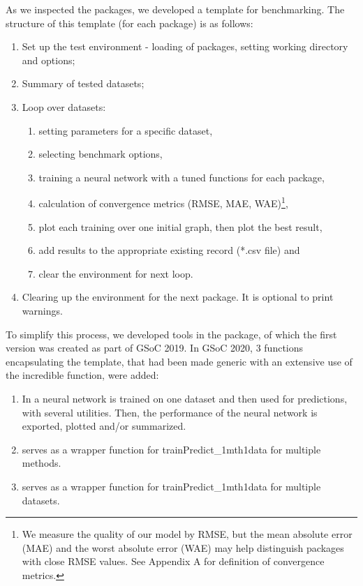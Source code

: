 As we inspected the packages, we developed a template for benchmarking.
The structure of this template (for each package) is as follows:

\begin{enumerate}
\def\labelenumi{\arabic{enumi}.}
\tightlist
\item
  Set up the test environment - loading of packages, setting working
  directory and options;
\item
  Summary of tested datasets;
\item
  Loop over datasets:

  \begin{enumerate}
  \def\labelenumii{\alph{enumii}.}
  \tightlist
  \item
    setting parameters for a specific dataset,
  \item
    selecting benchmark options,
  \item
    training a neural network with a tuned functions for each package,
  \item
    calculation of convergence metrics (RMSE, MAE, WAE)\footnote{We
      measure the quality of our model by RMSE, but the mean absolute
      error (MAE) and the worst absolute error (WAE) may help
      distinguish packages with close RMSE values. See Appendix A for
      definition of convergence metrics.},
  \item
    plot each training over one initial graph, then plot the best
    result,
  \item
    add results to the appropriate existing record (*.csv file) and
  \item
    clear the environment for next loop.
  \end{enumerate}
\item
  Clearing up the environment for the next package. It is optional to
  print warnings.
\end{enumerate}

To simplify this process, we developed tools in the 
package, of which the first version was created as part of GSoC 2019. In
GSoC 2020, 3 functions encapsulating the template, that had been made
generic with an extensive use of the incredible  function,
were added:

\begin{enumerate}
\def\labelenumi{\arabic{enumi}.}
\tightlist
\item
  In  a neural network is trained on one
  dataset and then used for predictions, with several utilities. Then,
  the performance of the neural network is exported, plotted and/or
  summarized.
\item
   serves as a wrapper function for
  trainPredict\_1mth1data for multiple methods.
\item
   serves as a wrapper function for
  trainPredict\_1mth1data for multiple datasets.
\end{enumerate}

